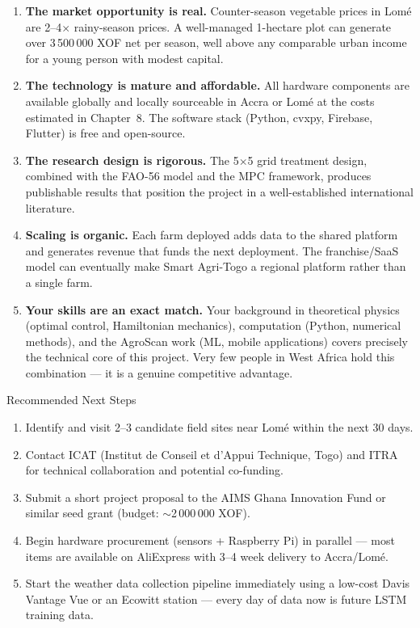 \documentclass[12pt, a4paper]{report}
\begin{document}
\begin{enumerate}[leftmargin=2em]
  \item \textbf{The market opportunity is real.} Counter-season vegetable prices in Lomé are 2–4$\times$ rainy-season prices. A well-managed 1-hectare plot can generate over 3\,500\,000 XOF net per season, well above any comparable urban income for a young person with modest capital.

  \item \textbf{The technology is mature and affordable.} All hardware components are available globally and locally sourceable in Accra or Lomé at the costs estimated in Chapter~8. The software stack (Python, cvxpy, Firebase, Flutter) is free and open-source.

  \item \textbf{The research design is rigorous.} The 5$\times$5 grid treatment design, combined with the FAO-56 model and the MPC framework, produces publishable results that position the project in a well-established international literature.

  \item \textbf{Scaling is organic.} Each farm deployed adds data to the shared platform and generates revenue that funds the next deployment. The franchise/SaaS model can eventually make Smart Agri-Togo a regional platform rather than a single farm.

  \item \textbf{Your skills are an exact match.} Your background in theoretical physics (optimal control, Hamiltonian mechanics), computation (Python, numerical methods), and the AgroScan work (ML, mobile applications) covers precisely the technical core of this project. Very few people in West Africa hold this combination — it is a genuine competitive advantage.
\end{enumerate}

\begin{keybox}{Recommended Next Steps}
\begin{enumerate}[leftmargin=1.5em]
  \item Identify and visit 2–3 candidate field sites near Lomé within the next 30 days.
  \item Contact ICAT (Institut de Conseil et d'Appui Technique, Togo) and ITRA for technical collaboration and potential co-funding.
  \item Submit a short project proposal to the AIMS Ghana Innovation Fund or similar seed grant (budget: $\sim$2\,000\,000 XOF).
  \item Begin hardware procurement (sensors + Raspberry Pi) in parallel — most items are available on AliExpress with 3–4 week delivery to Accra/Lomé.
  \item Start the weather data collection pipeline immediately using a low-cost Davis Vantage Vue or an Ecowitt station — every day of data now is future LSTM training data.
\end{enumerate}
\end{keybox}
\end{document}
